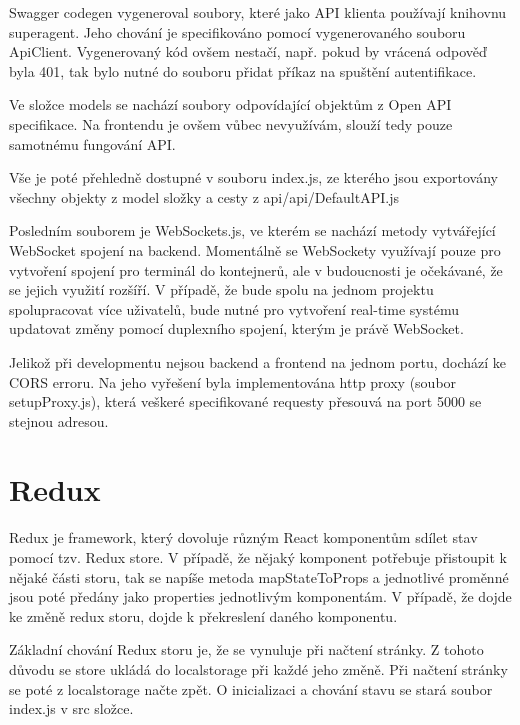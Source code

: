 \documentclass[a4paper,oneside,12pt]{report}
\begin{document}
Swagger codegen vygeneroval soubory, které jako API klienta používají knihovnu superagent. Jeho chování je specifikováno pomocí vygenerovaného souboru ApiClient. Vygenerovaný kód ovšem nestačí, např. pokud by vrácená odpověď byla 401, tak bylo nutné do souboru přidat příkaz na spuštění autentifikace.

Ve složce models se nachází soubory odpovídající objektům z Open API specifikace. Na frontendu je ovšem vůbec nevyužívám, slouží tedy pouze samotnému fungování API.

Vše je poté přehledně dostupné v souboru index.js, ze kterého jsou exportovány všechny objekty z model složky a cesty z api/api/DefaultAPI.js

Posledním souborem je WebSockets.js, ve kterém se nachází metody vytvářející WebSocket spojení na backend. Momentálně se WebSockety využívají pouze pro vytvoření spojení pro terminál do kontejnerů, ale v budoucnosti je očekávané, že se jejich využití rozšíří. V případě, že bude spolu na jednom projektu spolupracovat více uživatelů, bude nutné pro vytvoření real-time systému updatovat změny pomocí duplexního spojení, kterým je právě WebSocket.

Jelikož při developmentu nejsou backend a frontend na jednom portu, dochází ke CORS erroru. Na jeho vyřešení byla implementována http proxy (soubor setupProxy.js), která veškeré specifikované requesty přesouvá na port 5000 se stejnou adresou.


\section{Redux}

Redux je framework, který dovoluje různým React komponentům sdílet stav pomocí tzv. Redux store.
V případě, že nějaký komponent potřebuje přistoupit k nějaké části storu, tak se napíše metoda mapStateToProps a jednotlivé proměnné jsou poté předány jako properties jednotlivým komponentám.
V případě, že dojde ke změně redux storu, dojde k překreslení daného komponentu.


Základní chování Redux storu je, že se vynuluje při načtení stránky.
Z tohoto důvodu se store ukládá do localstorage při každé jeho změně.
Při načtení stránky se poté z localstorage načte zpět.
O inicializaci a chování stavu se stará soubor index.js v src složce.
\end{document}
